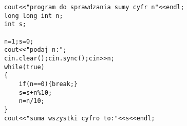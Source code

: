 \begin{verbatim}
cout<<"program do sprawdzania sumy cyfr n"<<endl;     
long long int n;
int s;

n=1;s=0;
cout<<"podaj n:";
cin.clear();cin.sync();cin>>n;
while(true)
{   
    if(n==0){break;}
    s=s+n%10;
    n=n/10;   
}
cout<<"suma wszystki cyfro to:"<<s<<endl;  
\end{verbatim}